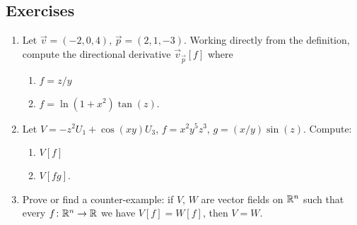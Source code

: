 \subsection*{Exercises}

\begin{enumerate}
\item Let $\vec{v}=(-2,0,4)$, $\vec{p}=(2,1,-3)$. Working directly from
  the definition, compute the directional derivative
  $\vec{v}_{\vec{p}}[f]$ where
  \begin{enumerate}
  \item $f=z/y$
  \item $f=\ln(1+x^{2})\tan(z)$.
  \end{enumerate}
\item Let $V = -z^{2}U_{1} + \cos(xy)U_{3}$, $f=x^{2}y^{5}z^{3}$, $g=(x/y)\sin(z)$.
  Compute:
  \begin{enumerate}
  \item $V[f]$
  \item $V[fg]$.
  \end{enumerate}
\item Prove or find a counter-example: if $V$, $W$ are vector fields on
  $\mathbb{R}^{n}$ such that every $f\colon\mathbb{R}^{n}\to\mathbb{R}$ we have $V[f]=W[f]$,
  then $V=W$.
\end{enumerate}

